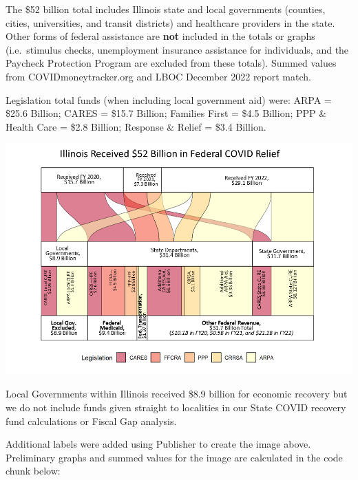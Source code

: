 \documentclass[
  letterpaper,
  DIV=11,
  numbers=noendperiod]{scrreport}
\begin{document}
The \$52 billion total includes Illinois state and local governments
(counties, cities, universities, and transit districts) and healthcare
providers in the state. Other forms of federal assistance are
\textbf{not} included in the totals or graphs (i.e.~stimulus checks,
unemployment insurance assistance for individuals, and the Paycheck
Protection Program are excluded from these totals). Summed values from
COVIDmoneytracker.org and LBOC December 2022 report match.

Legislation total funds (when including local government aid) were: ARPA
= \$25.6 Billion; CARES = \$15.7 Billion; Families First = \$4.5
Billion; PPP \& Health Care = \$2.8 Billion; Response \& Relief = \$3.4
Billion.

\includegraphics{./images/rev_CMT_52bil-01.png}

Local Governments within Illinois received \$8.9 billion for economic
recovery but we do not include funds given straight to localities in our
State COVID recovery fund calculations or Fiscal Gap analysis.

Additional labels were added using Publisher to create the image above.
Preliminary graphs and summed values for the image are calculated in the
code chunk below:
\end{document}
